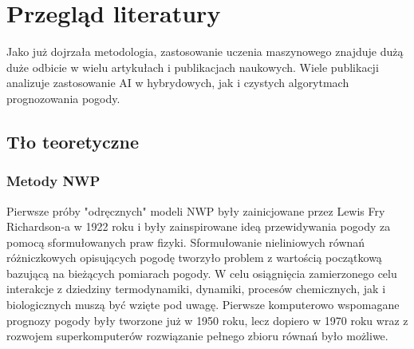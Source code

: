 

\section{Przegląd literatury}

Jako już dojrzała metodologia, zastosowanie uczenia maszynowego 
znajduje dużą duże odbicie w wielu artykułach i publikacjach naukowych. 
Wiele publikacji analizuje zastosowanie AI w hybrydowych, jak i czystych 
algorytmach prognozowania pogody. 


\subsection{Tło teoretyczne}


\subsubsection{Metody NWP}

Pierwsze próby "odręcznych" modeli NWP były zainicjowane przez Lewis Fry Richardson-a w 1922 roku i 
były zainspirowane ideą przewidywania pogody za pomocą sformułowanych praw fizyki. Sformułowanie
nieliniowych równań różniczkowych opisujących pogodę tworzyło problem z wartością początkową bazującą
na bieżących pomiarach pogody. W celu osiągnięcia zamierzonego celu interakcje z dziedziny 
termodynamiki, dynamiki, procesów chemicznych, jak i biologicznych muszą być wzięte pod uwagę.
Pierwsze komputerowo wspomagane prognozy pogody były tworzone już w 1950 roku, lecz dopiero
w 1970 roku wraz z rozwojem superkomputerów rozwiązanie pełnego zbioru równań było możliwe.


